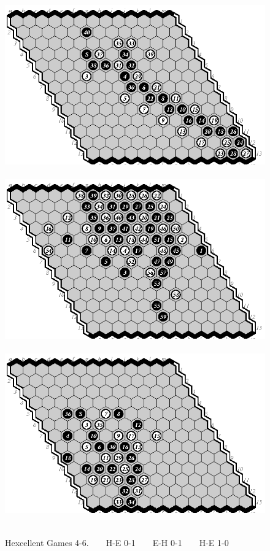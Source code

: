 \documentclass{icga}
\def\Hent{\mbox{\sc Hexcellent}}
\begin{document}
\begin{figure}[hbp]
\hspace*{-2cm}\
\includegraphics[scale=1]{pix/13.he2.eps}\hspace*{-2cm}\
\includegraphics[scale=1]{pix/13.eh3.eps}\hspace*{-2cm}\
\includegraphics[scale=1]{pix/13.he4.eps}\hspace*{-2cm}\
\caption{\Hent{} Games 4-6. ~ ~ H-E 0-1 ~ ~ E-H 0-1 ~ ~ H-E 1-0}
\end{figure}
\end{document}
